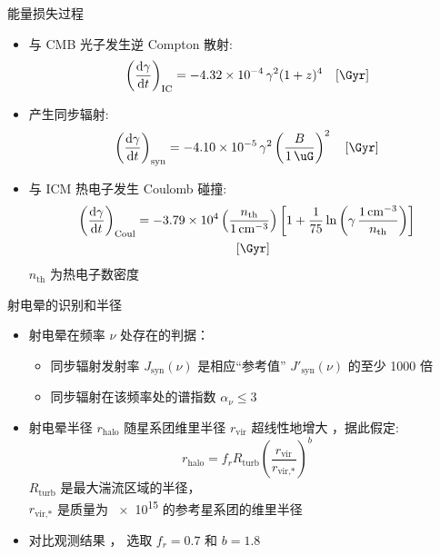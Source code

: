 \documentclass{beamer}
\newcommand{\R}[1]{\text{#1}}  %
\newcommand{\D}[1]{\R{d}#1}
\newcommand{\diff}[2]{\frac{\D{#1}}{\D{#2}}}
\begin{document}
\begin{frame}
  \vspace{1ex}
  \begin{alertblock}{能量损失过程}
    \smallskip
    \begin{itemize}
      \item 与 CMB 光子发生逆 Compton 散射:
        \begin{equation}
          \left( \diff{\gamma}{t} \right)_{\R{IC}} =
            \num{-4.32e-4} \,\gamma^2 (1+z)^4
            \quad [\si{\per\Gyr}]
        \end{equation}
      \item 产生同步辐射:
        \begin{equation}
          \left( \diff{\gamma}{t} \right)_{\R{syn}} =
            \num{-4.10e-5} \,\gamma^2
            \left( \frac{B}{\SI{1}{\uG}} \right)^2
            \quad [\si{\per\Gyr}]
        \end{equation}
      \item 与 ICM 热电子发生 Coulomb 碰撞:
        \begin{multline}
          \left( \diff{\gamma}{t} \right)_{\R{Coul}} =
            \num{-3.79e4} \left( \frac{n_{\R{th}}}{\SI{1}{\per\cm\cubed}} \right)
            \left[ 1 + \frac{1}{75} \ln \left(
              \gamma\,\frac{\SI{1}{\per\cm\cubed}}{n_{\R{th}}} \right) \right]
            \\ \quad [\si{\per\Gyr}]
        \end{multline}
        $n_{\R{th}}$ 为热电子数密度
    \end{itemize}
  \end{alertblock}
\end{frame}

\begin{frame}{射电晕的识别和半径}
  \begin{itemize}
    \item 射电晕在频率 $\nu$ 处存在的判据：
      \begin{itemize}
        \item 同步辐射发射率 $J_{\R{syn}}(\nu)$
          是相应\enquote{参考值} $J'_{\R{syn}}(\nu)$ 的至少 1000 倍
        \item 同步辐射在该频率处的谱指数 $\alpha_{\nu} \le 3$
      \end{itemize}

    \item 射电晕半径 $r_{\R{halo}}$ 随星系团维里半径 $r_{\R{vir}}$
      超线性地增大 \cite{cassano2007}，据此假定:
      \begin{equation}
        r_{\R{halo}} = f_r R_{\R{turb}}
          \left( \frac{r_{\R{vir}}}{r_{\R{vir,*}}} \right)^b
      \end{equation}
      $R_{\R{turb}}$ 是最大湍流区域的半径，\\
      $r_{\R{vir,*}}$ 是质量为 \SI{e15}{\solarmass} 的参考星系团的维里半径
    \item 对比观测结果 \cite{cassano2007}，
      选取 $f_r = 0.7$ 和 $b = 1.8$
  \end{itemize}
\end{frame}
\end{document}
